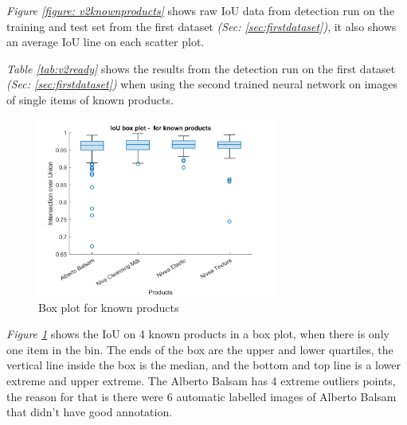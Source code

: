 \textit{Figure \ref{figure: v2knownproducts}} shows raw IoU data from detection run on the training and test set from the first dataset \textit{(Sec: \ref{sec:firstdataset})}, it also shows an average IoU line on each scatter plot.

\begin{table}[h]
\caption{Detection results when tested on trained data}
\label{tab:v2ready}
\end{table}
\textit{Table \ref{tab:v2ready}} shows the results from the detection run on the first dataset \textit{(Sec: \ref{sec:firstdataset})} when using the second trained neural network on images of single items of known products.

\begin{figure}[h]
    \centering
    \includegraphics[width=0.7\textwidth]{graphics/results/v2boxplotForKnownProducts.png}
    \caption{Box plot for known products}
    \label{fig:v2boxknownproducts}
\end{figure}
\textit{Figure \ref{fig:v2boxknownproducts}} shows the IoU on 4 known products in a box plot, when there is only one item in the bin. The ends of the box are the upper and lower quartiles,  the vertical line inside the box is the median, and the bottom and top line is a lower extreme and upper extreme. The Alberto Balsam has 4 extreme outliers points, the
reason for that is there were 6 automatic labelled images 
of Alberto Balsam that didn’t have good annotation. 

